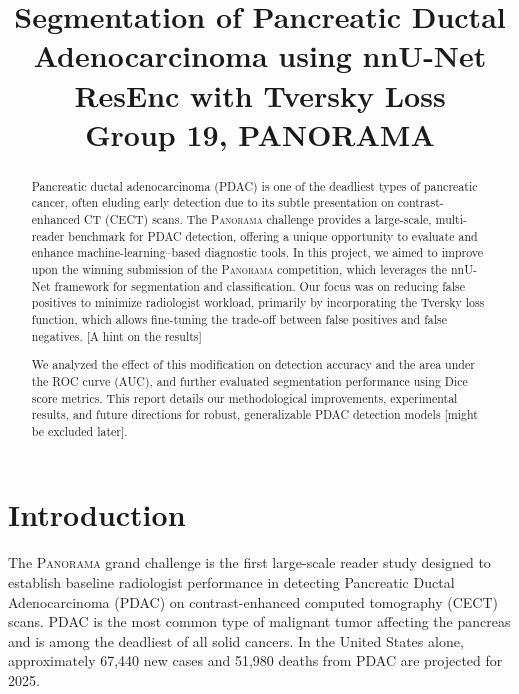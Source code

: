 \documentclass[conference]{IEEEtran}
\begin{document}
\title{Segmentation of Pancreatic Ductal Adenocarcinoma using nnU-Net ResEnc with Tversky Loss \\ {\Large Group 19, PANORAMA}}

\author{
\and
{}
\and
{}
\and
{}
}

\maketitle

\begin{abstract}
Pancreatic ductal adenocarcinoma (PDAC) is one of the deadliest types of pancreatic cancer, often eluding early detection due to its subtle presentation on contrast-enhanced CT (CECT) scans. The \textsc{Panorama} challenge provides a large-scale, multi-reader benchmark for PDAC detection, offering a unique opportunity to evaluate and enhance machine-learning–based diagnostic tools. In this project, we aimed to improve upon the winning submission of the \textsc{Panorama} competition, which leverages the nnU-Net framework for segmentation and classification. Our focus was on reducing false positives to minimize radiologist workload, primarily by incorporating the Tversky loss function, which allows fine-tuning the trade-off between false positives and false negatives. [A hint on the results]


We analyzed the effect of this modification on detection accuracy and the area under the ROC curve (AUC), and further evaluated segmentation performance using Dice score metrics. This report details our methodological improvements, experimental results, and future directions for robust, generalizable PDAC detection models [might be excluded later].

\end{abstract}

\section{Introduction}
The \textsc{Panorama} grand challenge \cite{b5} is the first large-scale reader study designed to establish baseline radiologist performance in detecting Pancreatic Ductal Adenocarcinoma (PDAC) on contrast-enhanced computed tomography (CECT) scans. PDAC is the most common type of malignant tumor affecting the pancreas and is among the deadliest of all solid cancers. In the United States alone, approximately 67,440 new cases and 51,980 deaths from PDAC are projected for 2025\cite{b2}.
\end{document}
